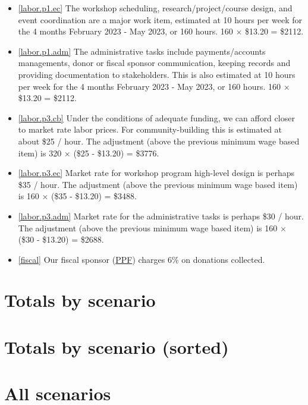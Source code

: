 \documentclass[10pt]{article}
\begin{document}
\begin{itemize}[leftmargin=*]
  \item[]{\ref{labor.p1.ec} The workshop scheduling, research/project/course design, and event coordination are a major work item, estimated at 10 hours per week for the 4 months February 2023 - May 2023, or 160 hours. 160 $\times$ \$13.20 = \$2112.}
  \item[]{\ref{labor.p1.adm} The administrative tasks include payments/accounts managements, donor or fiscal sponsor communication, keeping records and providing documentation to stakeholders. This is also estimated at 10 hours per week for the 4 months February 2023 - May 2023, or 160 hours. 160 $\times$ \$13.20 = \$2112.}
  \item[]{\ref{labor.p3.cb} Under the conditions of adequate funding, we can afford closer to market rate labor prices. For community-building this is estimated at about \$25 / hour. The adjustment (above the previous minimum wage based item) is 320 $\times$ (\$25 - \$13.20) = \$3776.}
  \item[]{\ref{labor.p3.ec} Market rate for workshop program high-level design is perhaps \$35 / hour. The adjustment (above the previous minimum wage based item) is 160 $\times$ (\$35 - \$13.20) = \$3488.}
  \item[]{\ref{labor.p3.adm} Market rate for the administrative tasks is perhaps \$30 / hour. The adjustment (above the previous minimum wage based item) is 160 $\times$ (\$30 - \$13.20) = \$2688.}
  \item[]{\ref{fiscal} Our fiscal sponsor (\href{https://www.ppf.org/fiscal-sponsorship}{PPF}) charges 6\% on donations collected.}
\end{itemize}

\newpage
\section*{Totals by scenario}



\newpage
\section*{Totals by scenario (sorted)}



\newpage
\section*{All scenarios}
\newpage


\end{document}
